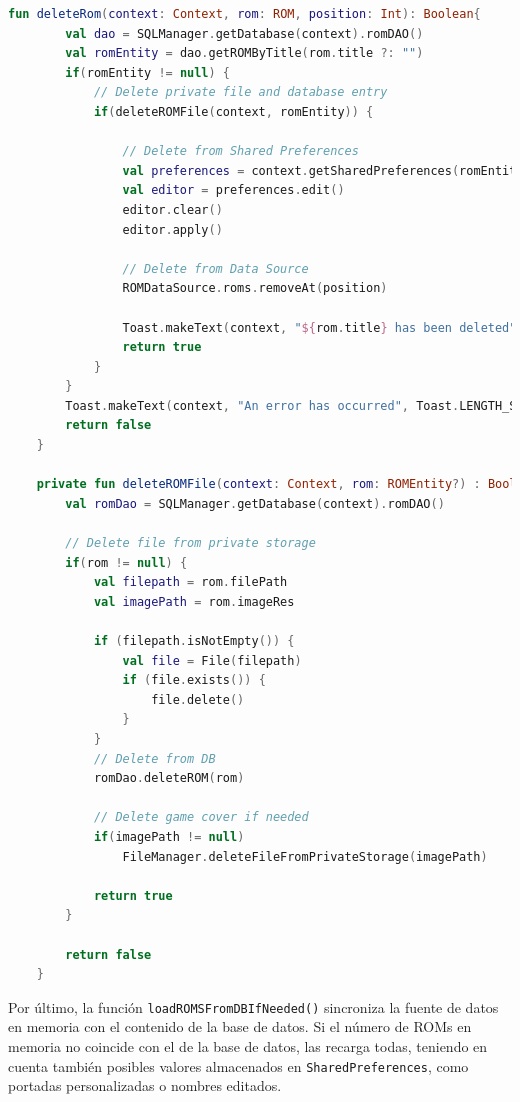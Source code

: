 \begin{lstlisting}[language=Kotlin, caption={ROM Management - Eliminar una ROM.}, label={code:romManagementDeleteRom}]
    fun deleteRom(context: Context, rom: ROM, position: Int): Boolean{
        val dao = SQLManager.getDatabase(context).romDAO()
        val romEntity = dao.getROMByTitle(rom.title ?: "")
        if(romEntity != null) {
            // Delete private file and database entry
            if(deleteROMFile(context, romEntity)) {

                // Delete from Shared Preferences
                val preferences = context.getSharedPreferences(romEntity.id.toString(), Context.MODE_PRIVATE)
                val editor = preferences.edit()
                editor.clear()
                editor.apply()

                // Delete from Data Source
                ROMDataSource.roms.removeAt(position)

                Toast.makeText(context, "${rom.title} has been deleted", Toast.LENGTH_SHORT).show()
                return true
            }
        }
        Toast.makeText(context, "An error has occurred", Toast.LENGTH_SHORT).show()
        return false
    }

    private fun deleteROMFile(context: Context, rom: ROMEntity?) : Boolean {
        val romDao = SQLManager.getDatabase(context).romDAO()

        // Delete file from private storage
        if(rom != null) {
            val filepath = rom.filePath
            val imagePath = rom.imageRes

            if (filepath.isNotEmpty()) {
                val file = File(filepath)
                if (file.exists()) {
                    file.delete()
                }
            }
            // Delete from DB
            romDao.deleteROM(rom)

            // Delete game cover if needed
            if(imagePath != null)
                FileManager.deleteFileFromPrivateStorage(imagePath)

            return true
        }

        return false
    }
\end{lstlisting}

Por último, la función \texttt{loadROMSFromDBIfNeeded()} sincroniza la fuente de datos en memoria con el contenido de la base de datos. Si el número de ROMs en memoria no coincide con el de la base de datos, las recarga todas, teniendo en cuenta también posibles valores almacenados en \texttt{SharedPreferences}, como portadas personalizadas o nombres editados.

